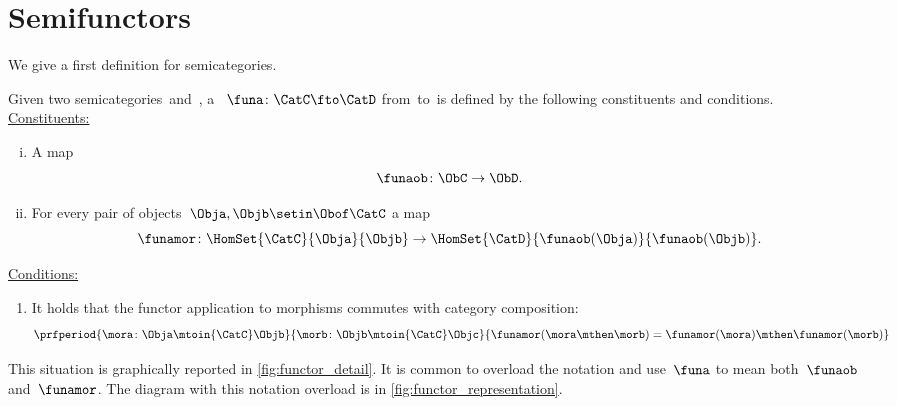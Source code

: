 
\section{Semifunctors}

We give a first definition for semicategories.


\begin{ctdefinition}
    \label{def:semi-functor}
    Given two semicategories~\CatC and~\CatD, a \emph{}~$\funa\colon \CatC\fto \CatD$ from~\CatC to~\CatD is defined by the following constituents and conditions.
    \\
    \underline{Constituents:}
    \begin{enumerate}
        [i)]
        \item A map
              \begin{equation}
                  \funaob \colon \ObC \to \ObD.
              \end{equation}
        \item For every pair of objects~$\Obja, \Objb\setin \Obof\CatC$ a map
              \begin{equation}
                  \funamor\colon \HomSet{\CatC}{\Obja}{\Objb} \to \HomSet{\CatD}{\funaob(\Obja)}{\funaob(\Objb)}.
              \end{equation}
    \end{enumerate}
    \underline{Conditions:}
    \begin{enumerate}
        \item It holds that the functor application to morphisms commutes with category composition:
              \begin{equation}
                  \prfperiod{
                      \mora\colon \Obja \mtoin{\CatC} \Objb
                  }{
                      \morb\colon \Objb \mtoin{\CatC} \Objc
                  }{
                      \funamor(\mora \mthen \morb)=\funamor(\mora)\mthen \funamor(\morb)
                  }
              \end{equation}
    \end{enumerate}
\end{ctdefinition}

This situation is graphically reported in \cref{fig:functor_detail}.
%
It is common to overload the notation and use~$\funa$ to mean both~$\funaob$ and~$\funamor$.
The diagram with this notation overload is in \cref{fig:functor_representation}.

